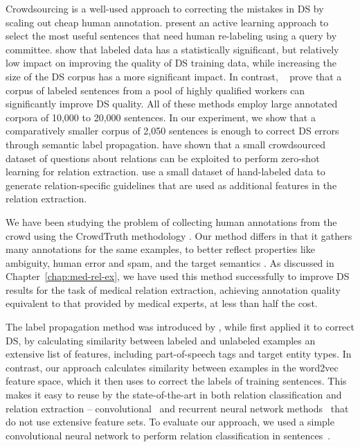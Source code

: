 Crowdsourcing is a well-used approach to correcting the mistakes in DS by scaling out cheap human annotation. \citet{angeli2014combining} present an active learning approach to select the most useful sentences that need human re-labeling using a query by committee. \citet{zhang2012big} show that labeled data has a statistically significant, but relatively low impact on improving the quality of DS training data, while increasing the size of the DS corpus has a more significant impact. In contrast, ~\citet{liu2016effective} prove that a corpus of labeled sentences from a pool of highly qualified workers can significantly improve DS quality. All of these methods employ large annotated corpora of 10,000 to 20,000 sentences. In our experiment, we show that a comparatively smaller corpus of 2,050 sentences is enough to correct DS errors through semantic label propagation. \citet{levy2017zero} have shown that a small crowdsourced dataset of questions about relations can be exploited to perform zero-shot learning for relation extraction. \citet{pershina2014infusion} use a small dataset of hand-labeled data to generate relation-specific guidelines that are used as additional features in the relation extraction.

We have been studying the problem of collecting human annotations from the crowd using the CrowdTruth methodology \cite{aroyo2013crowd}.  Our method differs in that it gathers many annotations for the same examples, to better reflect properties like ambiguity, human error and spam, and the target semantics \cite{aroyo2014threesides}. As discussed in Chapter~\ref{chap:med-rel-ex}, we have used this method successfully to improve DS results for the task of medical relation extraction, achieving annotation quality equivalent to that provided by medical experts, at less than half the cost.

The label propagation method was introduced by \citet{xiaojin2002learning}, while \citet{Chen:2006:REU:1220175.1220192} first applied it to correct DS, by calculating similarity between labeled and unlabeled examples an extensive list of features, including part-of-speech tags and target entity types. In contrast, our approach calculates similarity between examples in the word2vec~\cite{mikolov2013distributed} feature space, which it then uses to correct the labels of training sentences. This makes it easy to reuse by the state-of-the-art in both relation classification and relation extraction -- convolutional~\cite{ji2017distant} and recurrent neural network methods~\cite{zhou2016attention} that do not use extensive feature sets. To evaluate our approach, we used a simple convolutional neural network to perform relation classification in sentences~\cite{nguyen2015relation}. 

